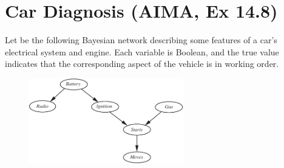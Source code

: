 \documentclass[11pt, a4paper]{article}
\begin{document}
\newpage

\section{Car Diagnosis (AIMA, Ex 14.8)}

Let be the following Bayesian network describing some features of a car's electrical system and engine. Each variable is Boolean, and the true value indicates that the corresponding aspect of the vehicle is in working order.

\begin{figure}[h]
    \centering
    \includegraphics[width=0.6\textwidth]{figures/e3_car.pdf}
\end{figure}
\end{document}
